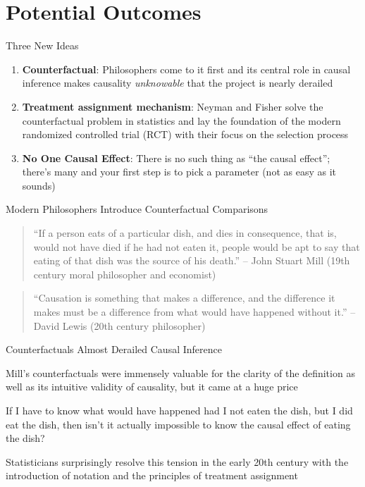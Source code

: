 \documentclass{beamer}
\begin{document}
\section{Potential Outcomes}

\begin{frame}{Three New Ideas}

\begin{enumerate}
\item \textbf{Counterfactual}: Philosophers come to it first and its central role in causal inference makes causality \emph{unknowable} that the project is nearly derailed
\item \textbf{Treatment assignment mechanism}: Neyman and Fisher solve the counterfactual problem in statistics and lay the foundation of the modern randomized controlled trial (RCT) with their focus on the selection process
\item \textbf{No One Causal Effect}: There is no such thing as ``the causal effect''; there's many and your first step is to pick a parameter (not as easy as it sounds)
\end{enumerate}


\end{frame}



\begin{frame}{Modern Philosophers Introduce Counterfactual Comparisons}

\begin{quote}
    ``If a person eats of a particular dish, and dies in consequence, that is, would not have died if he had not eaten it, people would be apt to say that eating of that dish was the source of his death.'' -- John Stuart Mill (19th century moral philosopher and economist)
\end{quote}

\bigskip
  
    \begin{quote}
    ``Causation is something that makes a difference, and the difference it makes must be a difference from what would have happened without it.'' -- David Lewis (20th century philosopher)
\end{quote}

\end{frame}

  
\begin{frame}{Counterfactuals Almost Derailed Causal Inference}



Mill's counterfactuals were immensely valuable for the clarity of the definition as well as its intuitive validity of causality, but it came at a huge price 

\bigskip

If I have to know what would have happened had I not eaten the dish, but I did eat the dish, then isn't it actually impossible to know the causal effect of eating the dish?

\bigskip

Statisticians surprisingly resolve this tension in the early 20th century with the introduction of notation and the principles of treatment assignment


\end{frame}
\end{document}
